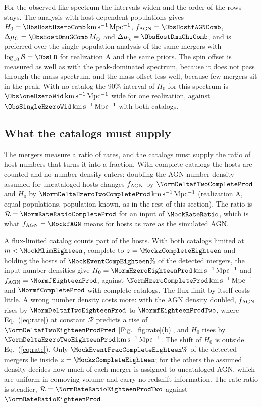 \documentclass[aps,prd,reprint,superscriptaddress,nofootinbib,nolongbibliography,floatfix]{revtex4-2}
\newcommand{\kms}{\,\mathrm{km\,s^{-1}\,Mpc^{-1}}}
\newcommand{\Msun}{M_\odot}
\newcommand{\fagn}{f_{\rm AGN}}
\newcommand{\RR}{\mathcal{R}}
\newcommand{\dmug}{\Delta\mu_{\rm G}}
\newcommand{\dmuchi}{\Delta\mu_{\chi}}
\newcommand{\lB}{\log_{10}\mathcal{B}}
\begin{document}
For the observed-like spectrum the intervals widen and the order of the rows stays. %
The analysis with host-dependent populations gives $H_0=\ObsHostHzeroComb\kms$, $\fagn=\ObsHostfAGNComb$, $\dmug=\ObsHostDmuGComb\,\Msun$ and $\dmuchi=\ObsHostDmuChiComb$, and is preferred over the single-population analysis of the same mergers with $\lB=\ObsLB$ for realization A and the same priors. %
The spin offset is measured as well as with the peak-dominated spectrum, because it does not pass through the mass spectrum, and the mass offset less well, because few mergers sit in the peak. %
With no catalog the 90\% interval of $H_0$ for this spectrum is $\ObsNoneHzeroWid\kms$ wide for one realization, against $\ObsSingleHzeroWid\kms$ with both catalogs.

\subsection{What the catalogs must supply}
\label{sec:supply}

The mergers measure a ratio of rates, and the catalogs must supply the ratio of host numbers that turns it into a fraction.
With complete catalogs the hosts are counted and no number density enters: doubling the AGN number density assumed for uncataloged hosts changes $\fagn$ by $\NormDeltafTwoCompleteProd$ and $H_0$ by $\NormDeltaHzeroTwoCompleteProd\kms$ (realization A, equal populations, population known, as in the rest of this section).
The ratio is $\RR=\NormRateRatioCompleteProd$ for an input of $\MockRateRatio$, which is what $\fagn=\MockfAGN$ means for hosts as rare as the simulated AGN.

A flux-limited catalog counts part of the hosts.
With both catalogs limited at $m<\MockMlimEighteen$, complete to $z=\MockzCompleteEighteen$ and holding the hosts of $\MockEventCompEighteen\%$ of the detected mergers, the input number densities give $H_0=\NormHzeroEighteenProd\kms$ and $\fagn=\NormfEighteenProd$, against $\NormHzeroCompleteProd\kms$ and $\NormfCompleteProd$ with complete catalogs.
The flux limit by itself costs little.
A wrong number density costs more: with the AGN density doubled, $\fagn$ rises by $\NormDeltafTwoEighteenProd$ to $\NormfEighteenProdTwo$, where Eq.~(\ref{eq:rate}) at constant $\RR$ predicts a rise of $\NormDeltafTwoEighteenProdPred$ [Fig.~\ref{fig:rate}(b)], and $H_0$ rises by $\NormDeltaHzeroTwoEighteenProd\kms$.
The shift of $H_0$ is outside Eq.~(\ref{eq:rate}).
Only $\MockEventFracCompleteEighteen\%$ of the detected mergers lie inside $z=\MockzCompleteEighteen$; for the others the assumed density decides how much of each merger is assigned to uncataloged AGN, which are uniform in comoving volume and carry no redshift information.
The rate ratio is steadier, $\RR=\NormRateRatioEighteenProdTwo$ against $\NormRateRatioEighteenProd$.
\end{document}
